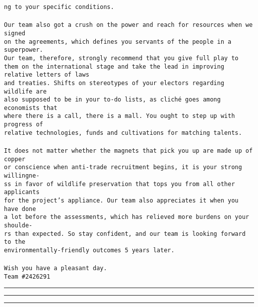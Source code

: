 \documentclass[12pt]{article}
\newcommand{\Team}{2426291}
\begin{document}
\texttt{ng to your specific conditions.}\\
\text{}\\
\texttt{Our team also got a crush on the power and reach for resources when we signed}\\
\texttt{on the agreements, which defines you servants of the people in a superpower.}\\
\texttt{Our team, therefore, strongly recommend that you give full play to them on the international stage and take the lead in improving relative letters of laws }\\
\texttt{and treaties. Shifts on stereotypes of your electors regarding wildlife are}\\
\texttt{also supposed to be in your to-do lists, as cliché goes among economists that}\\
\texttt{where there is a call, there is a mall. You ought to step up with progress of}\\
\texttt{relative technologies, funds and cultivations for matching talents.}\\
\text{}\\
\texttt{It does not matter whether the magnets that pick you up are made up of copper}\\
\texttt{or conscience when anti-trade recruitment begins, it is your strong willingne-}\\
\texttt{ss in favor of wildlife preservation that tops you from all other applicants}\\
\texttt{for the project's appliance. Our team also appreciates it when you have done}\\
\texttt{a lot before the assessments, which has relieved more burdens on your shoulde-}\\
\texttt{rs than expected. So stay confident, and our team is looking forward to the }\\
\texttt{environmentally-friendly outcomes 5 years later.}\\
\text{}\\
\texttt{Wish you have a pleasant day.}\\
\texttt{Team \#\Team}
\\
\hrule\hrule\hrule
\clearpage
\end{document}
